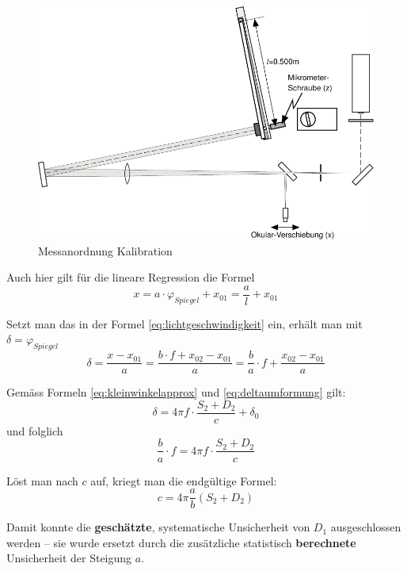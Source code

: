 \begin{figure}[H]
    \center
    \includegraphics[width=.8\textwidth]{images/kalibration.pdf}
    \caption{Messanordnung Kalibration}
    \label{fig:kalibration}
\end{figure}

Auch hier gilt f\"ur die lineare Regression die Formel
\begin{equation}
    x = a \cdot \varphi_{Spiegel} + x_{01} = \frac{a}{l} + x_{01}
    \label{eq:kalibration-a}
\end{equation}

Setzt man das in der Formel  \ref{eq:lichtgeschwindigkeit} ein, erh\"alt man mit
$\delta = \varphi_{Spiegel}$
\begin{equation}
    \delta = \frac{x - x_{01}}{a} = \frac{b \cdot f + x_{02} - x_{01}}{a} = \frac{b}{a} \cdot f + \frac{x_{02}-x_{01}}{a}
\end{equation}

Gem\"ass Formeln \ref{eq:kleinwinkelapprox} und \ref{eq:deltaumformung} gilt:
\begin{equation}
    \delta = 4\pi f \cdot \frac{S_2 + D_2}{c} + \delta_0
\end{equation}
und folglich
\begin{equation}
    \frac{b}{a} \cdot f = 4\pi f \cdot \frac{S_2 + D_2}{c}
\end{equation}

L\"ost man nach $c$ auf, kriegt man die endg\"ultige Formel:
\begin{equation}
    c = 4\pi\frac{a}{b}(S_2 + D_2)
    \label{eq:lichtgeschwindigkeit_genauer}
\end{equation}

Damit konnte  die  \textbf{gesch\"atzte},  systematische  Unsicherheit von $D_1$
ausgeschlossen werden -- sie wurde ersetzt  durch  die zus\"atzliche statistisch
\textbf{berechnete} Unsicherheit der Steigung $a$.


